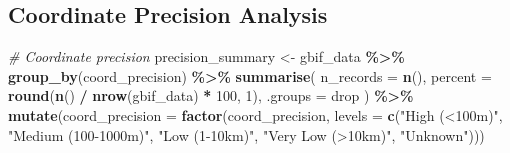 \documentclass[
]{article}
\newenvironment{Shaded}{\begin{snugshade}}{\end{snugshade}}
\newcommand{\AttributeTok}[1]{\textcolor[rgb]{0.13,0.29,0.53}{#1}}
\newcommand{\CommentTok}[1]{\textcolor[rgb]{0.56,0.35,0.01}{\textit{#1}}}
\newcommand{\DecValTok}[1]{\textcolor[rgb]{0.00,0.00,0.81}{#1}}
\newcommand{\FunctionTok}[1]{\textcolor[rgb]{0.13,0.29,0.53}{\textbf{#1}}}
\newcommand{\NormalTok}[1]{#1}
\newcommand{\OtherTok}[1]{\textcolor[rgb]{0.56,0.35,0.01}{#1}}
\newcommand{\SpecialCharTok}[1]{\textcolor[rgb]{0.81,0.36,0.00}{\textbf{#1}}}
\newcommand{\StringTok}[1]{\textcolor[rgb]{0.31,0.60,0.02}{#1}}
\begin{document}
\subsection{Coordinate Precision
Analysis}\label{coordinate-precision-analysis}

\begin{Shaded}
\begin{Highlighting}[]
\CommentTok{\# Coordinate precision}
\NormalTok{precision\_summary }\OtherTok{\textless{}{-}}\NormalTok{ gbif\_data }\SpecialCharTok{\%\textgreater{}\%}
  \FunctionTok{group\_by}\NormalTok{(coord\_precision) }\SpecialCharTok{\%\textgreater{}\%}
  \FunctionTok{summarise}\NormalTok{(}
    \AttributeTok{n\_records =} \FunctionTok{n}\NormalTok{(),}
    \AttributeTok{percent =} \FunctionTok{round}\NormalTok{(}\FunctionTok{n}\NormalTok{() }\SpecialCharTok{/} \FunctionTok{nrow}\NormalTok{(gbif\_data) }\SpecialCharTok{*} \DecValTok{100}\NormalTok{, }\DecValTok{1}\NormalTok{),}
    \AttributeTok{.groups =} \StringTok{\textquotesingle{}drop\textquotesingle{}}
\NormalTok{  ) }\SpecialCharTok{\%\textgreater{}\%}
  \FunctionTok{mutate}\NormalTok{(}\AttributeTok{coord\_precision =} \FunctionTok{factor}\NormalTok{(coord\_precision, }
                                  \AttributeTok{levels =} \FunctionTok{c}\NormalTok{(}\StringTok{"High (\textless{}100m)"}\NormalTok{, }\StringTok{"Medium (100{-}1000m)"}\NormalTok{, }
                                           \StringTok{"Low (1{-}10km)"}\NormalTok{, }\StringTok{"Very Low (\textgreater{}10km)"}\NormalTok{, }\StringTok{"Unknown"}\NormalTok{)))}


\end{Highlighting}
\end{Shaded}
\end{document}
